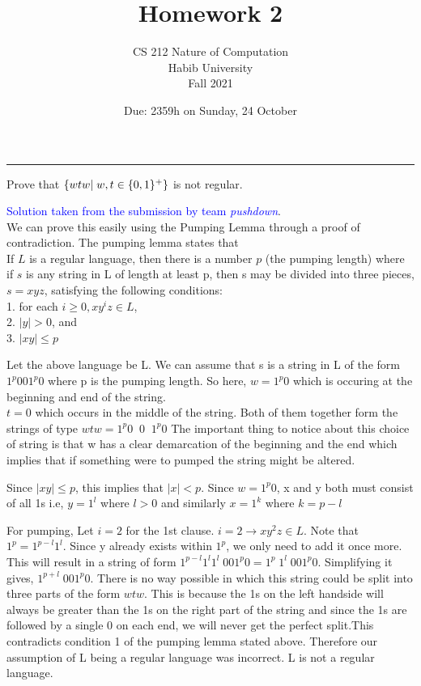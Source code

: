 \documentclass[a4page]{exam}
\title{Homework 2}
\author{CS 212 Nature of Computation\\Habib University\\Fall 2021}
\date{Due: 2359h on Sunday, 24 October}
\begin{document}
\maketitle
\thispagestyle{empty}

\noindent\rule{\textwidth}{1pt}

\begin{questions}
\question[10] Prove that $\{wtw | \hspace{1mm} w,t \in \{0,1\}^+\}$ is not regular.

  \begin{solution}
    \textcolor{blue}{Solution taken from the submission by team \textit{pushdown}}.\\
    We can prove this easily using the Pumping Lemma through a proof of contradiction. The pumping lemma states that
    \\If $L$ is a regular language, then there is a number $p$ (the
    pumping length) where if $s$ is any string in L of length at least p, then s may be divided into three pieces, $s = xyz$, satisfying the following conditions:
    \\1. for each $i \geq 0, xy^iz  \in L$,
    \\2. $|y| > 0$, and
    \\3. $|xy| \leq p$

    Let the above language be L. We can assume that s is a string in L of the form $1^p001^p0$
    where p is the pumping length.
    So here, $w = 1^p0$ which is occuring at the beginning and end of the string.
    \\$t=0$ which occurs in the middle of the string. Both of them together form the strings of type $wtw = 1^p0 \;\; 0 \;\; 1^p0$
    The important thing to notice about this choice of string is that w has a clear demarcation of the beginning and the end which implies that if something were to pumped the string might be altered.

    Since $|xy| \leq p$, this implies that $|x| < p$. Since $w = 1^p0$, x and y both must consist of all 1s i.e, $y = 1^l$ where $l>0$ and similarly $x = 1^k$ where $k = p -l$ 

    For pumping, Let $i = 2$ for the 1st clause. $i=2 \rightarrow xy^2z \in  L$. Note that $1^p = 1^{p-l}1^l$. Since y already exists within $1^p$, we only need to add it once more.
    This will result in a string of form $1^{p-l}1^l1^l\;001^p0 = 1^p \;1^l\;001^p0$.
    Simplifying it gives, $1^{p+l}\;001^p0$. There is no way possible in which this string could be split into three parts of the form $wtw$. This is because the 1s on the left handside will always be greater than the 1s on the right part of the string and since the 1s are followed by a single 0 on each end, we will never get the perfect split.This contradicts condition 1 of the pumping lemma stated above. Therefore our assumption of L being a regular language was incorrect. L is not a regular language.
  \end{solution}


\end{questions}
\end{document}
